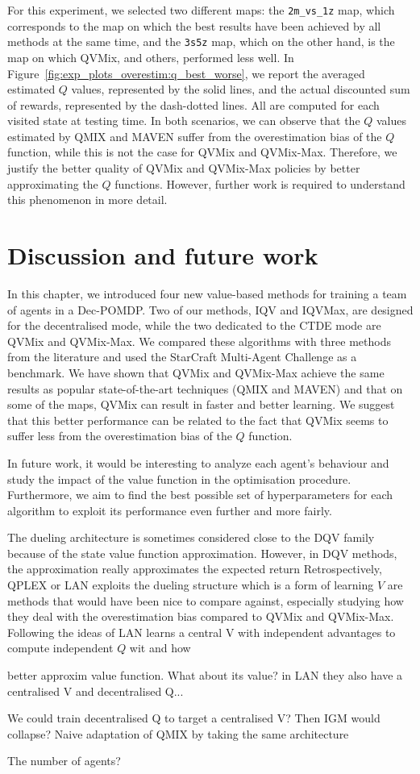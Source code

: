 For this experiment, we selected two different maps: the \texttt{2m\_vs\_1z} map, which corresponds to the map on which the best results have been achieved by all methods at the same time, and the \texttt{3s5z} map, which on the other hand, is the map on which QVMix, and others, performed less well.
In Figure~\ref{fig:exp_plots_overestim:q_best_worse}, we report the averaged estimated $Q$ values, represented by the solid lines, and the actual discounted sum of rewards, represented by the dash-dotted lines.
All are computed for each visited state at testing time.
In both scenarios, we can observe that the $Q$ values estimated by QMIX and MAVEN suffer from the overestimation bias of the $Q$ function, while this is not the case for QVMix and QVMix-Max.
Therefore, we justify the better quality of QVMix and QVMix-Max policies by better approximating the $Q$ functions.
However, further work is required to understand this phenomenon in more detail.

\section{Discussion and future work} \label{sec:ch4_conclusion}

In this chapter, we introduced four new value-based methods for training a team of agents in a Dec-POMDP.
Two of our methods, IQV and IQVMax, are designed for the decentralised mode, while the two dedicated to the CTDE mode are QVMix and QVMix-Max.
We compared these algorithms with three methods from the literature and used the StarCraft Multi-Agent Challenge as a benchmark. 
We have shown that QVMix and QVMix-Max achieve the same results as popular state-of-the-art techniques (QMIX and MAVEN) and that on some of the maps, QVMix can result in faster and better learning.
We suggest that this better performance can be related to the fact that QVMix seems to suffer less from the overestimation bias of the $Q$ function.

In future work, it would be interesting to analyze each agent's behaviour and study the impact of the value function in the optimisation procedure.
Furthermore, we aim to find the best possible set of hyperparameters for each algorithm to exploit its performance even further and more fairly.

The dueling architecture is sometimes considered close to the DQV family because of the state value function approximation.
However, in DQV methods, the approximation really approximates the expected return
Retrospectively, QPLEX \citep{wang2021qplex} or LAN\citep{avalos2023local} exploits the dueling structure which is a form of learning $V$ are methods that would have been nice to compare against, especially studying how they deal with the overestimation bias compared to QVMix and QVMix-Max.
Following the ideas of LAN learns a central V with independent advantages to compute independent $Q$ wit and how 


better approxim value function. What about its value? in LAN they also have a centralised V and decentralised Q...

We could train decentralised Q to target a centralised V? Then IGM would collapse?
Naive adaptation of QMIX by taking the same architecture

The number of agents?